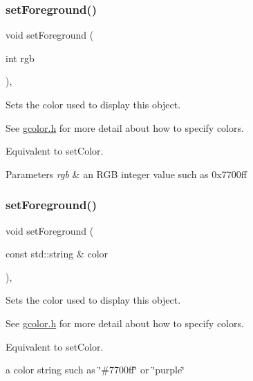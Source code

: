 \subsubsection{\texorpdfstring{set\+Foreground()}{setForeground()}\hspace{0.1cm}{\footnotesize\ttfamily [2/3]}}
{\footnotesize\ttfamily void set\+Foreground (\begin{DoxyParamCaption}\item[{int}]{rgb }\end{DoxyParamCaption})\hspace{0.3cm}{\ttfamily [virtual]}, {\ttfamily [inherited]}}



Sets the color used to display this object. 

See \mbox{\hyperlink{gcolor_8h_source}{gcolor.\+h}} for more detail about how to specify colors.

Equivalent to set\+Color.


\begin{DoxyParams}{Parameters}
{\em rgb} & an R\+GB integer value such as 0x7700ff \\
\hline
\end{DoxyParams}
\mbox{\label{classGObject_af59209aeadea6dfc6d97a2d8531f50e1}} 
\subsubsection{\texorpdfstring{set\+Foreground()}{setForeground()}\hspace{0.1cm}{\footnotesize\ttfamily [3/3]}}
{\footnotesize\ttfamily void set\+Foreground (\begin{DoxyParamCaption}\item[{const std\+::string \&}]{color }\end{DoxyParamCaption})\hspace{0.3cm}{\ttfamily [virtual]}, {\ttfamily [inherited]}}



Sets the color used to display this object. 

See \mbox{\hyperlink{gcolor_8h_source}{gcolor.\+h}} for more detail about how to specify colors.

Equivalent to set\+Color.

a color string such as \char`\"{}\#7700ff\char`\"{} or \char`\"{}purple\char`\"{} \mbox{\label{classGObject_a9e280bfc4544dfaf8e4376c4e1a74357}} 

